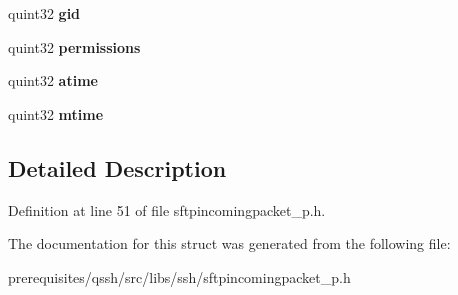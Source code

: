\begin{DoxyCompactItemize}
quint32 {\bfseries gid}
\item 
\mbox{\label{struct_q_ssh_1_1_internal_1_1_sftp_file_attributes_a539daccde3907ddd84fba0d4e78ae261}} 
quint32 {\bfseries permissions}
\item 
\mbox{\label{struct_q_ssh_1_1_internal_1_1_sftp_file_attributes_a2621a493e4dd5b4f05a8daa964475164}} 
quint32 {\bfseries atime}
\item 
\mbox{\label{struct_q_ssh_1_1_internal_1_1_sftp_file_attributes_ac5b4ddee1c6d9bd9d0ae777c972f3f15}} 
quint32 {\bfseries mtime}
\end{DoxyCompactItemize}


\subsection{Detailed Description}


Definition at line 51 of file sftpincomingpacket\+\_\+p.\+h.



The documentation for this struct was generated from the following file\+:\begin{DoxyCompactItemize}
\item 
prerequisites/qssh/src/libs/ssh/sftpincomingpacket\+\_\+p.\+h\end{DoxyCompactItemize}
